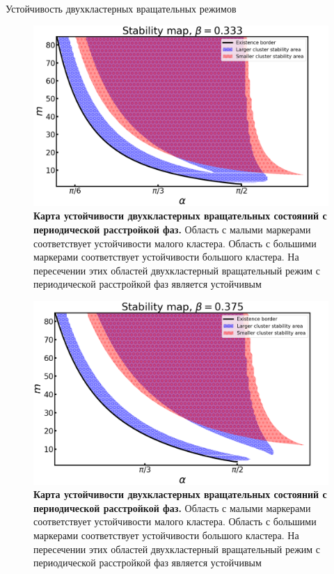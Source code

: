 \begin{chapter}{Устойчивость двухкластерных вращательных режимов}
	\begin{figure}[h!]\center
		\includegraphics[width=1\columnwidth]{pictures/map-0-33.png}
		\caption{\textbf{Карта устойчивости двухкластерных вращательных состояний с периодической расстройкой фаз.}
		Область с малыми маркерами соответствует устойчивости малого кластера.
		Область с большими маркерами соответствует устойчивости большого кластера.
		На пересечении этих областей двухкластерный вращательный режим с периодической расстройкой фаз является устойчивым}
		\label{map-0-33}
	\end{figure}


	\begin{figure}[h!]\center
		\includegraphics[width=1\columnwidth]{pictures/map-0-375.png}
		\caption{\textbf{Карта устойчивости двухкластерных вращательных состояний с периодической расстройкой фаз.}
		Область с малыми маркерами соответствует устойчивости малого кластера.
		Область с большими маркерами соответствует устойчивости большого кластера.
		На пересечении этих областей двухкластерный вращательный режим с периодической расстройкой фаз является устойчивым}
		\label{map-0375}
	\end{figure}


\end{chapter}
